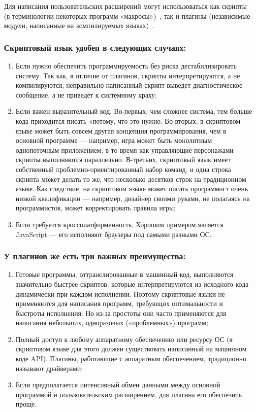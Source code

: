 Для написания пользовательских расширений могут использоваться как скрипты (в терминологии некоторых программ «макросы»)~\cite{automata-via-macros}, так и плагины (независимые модули, написанные на компилируемых языках)~\cite{addins-and-extensibility}.

\subsubsection{Скриптовый язык удобен в следующих случаях:}

\begin{enumerate}
\item Если нужно обеспечить программируемость без риска дестабилизировать систему. Так как, в отличие от плагинов, скрипты интерпретируются, а не компилируются, неправильно написанный скрипт выведет диагностическое сообщение, а не приведёт к системному краху;
\item Если важен выразительный код. Во-первых, чем сложнее система, тем больше кода приходится писать «потому, что это нужно. Во-вторых, в скриптовом языке может быть совсем другая концепция программирования, чем в основной программе — например, игра может быть монолитным однопоточным приложением, в то время как управляющие персонажами скрипты выполняются параллельно. В-третьих, скриптовый язык имеет собственный проблемно-ориентированный набор команд, и одна строка скрипта может делать то же, что несколько десятков строк на традиционном языке. Как следствие, на скриптовом языке может писать программист очень низкой квалификации — например, дизайнер своими руками, не полагаясь на программистов, может корректировать правила игры;
\item Если требуется кроссплатформенность. Хорошим примером является JavaScript — его исполняют браузеры под самыми разными ОС.
\end{enumerate}

\subsubsection{У плагинов же есть три важных преимущества:}

\begin{enumerate}
\item Готовые программы, оттранслированные в машинный код, выполняются значительно быстрее скриптов, которые интерпретируются из исходного кода динамически при каждом исполнении. Поэтому скриптовые языки не применяются для написания программ, требующих оптимальности и быстроты исполнения. Но из-за простоты они часто применяются для написания небольших, одноразовых («проблемных») программ;
\item Полный доступ к любому аппаратному обеспечению или ресурсу ОС (в скриптовом языке для этого должен существовать написанный на машинном коде API). Плагины, работающие с аппаратным обеспечением, традиционно называют драйверами;
\item Если предполагается интенсивный обмен данными между основной программой и пользовательским расширением, для плагина его обеспечить проще.
\end{enumerate}

